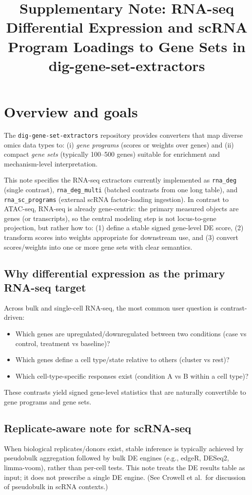\documentclass[11pt]{article}
\title{Supplementary Note: RNA-seq Differential Expression and scRNA Program Loadings to Gene Sets in dig-gene-set-extractors}
\author{}
\date{}
\begin{document}
\maketitle

\section*{Overview and goals}
The \texttt{dig-gene-set-extractors} repository provides converters that map diverse omics data types to:
(i) \emph{gene programs} (scores or weights over genes) and
(ii) compact \emph{gene sets} (typically 100--500 genes) suitable for enrichment and mechanism-level interpretation.

This note specifies the RNA-seq extractors currently implemented as \texttt{rna\_deg} (single contrast), \texttt{rna\_deg\_multi} (batched contrasts from one long table), and \texttt{rna\_sc\_programs} (external scRNA factor-loading ingestion). In contrast to ATAC-seq, RNA-seq is already gene-centric: the primary measured objects are genes (or transcripts), so the central modeling step is not locus-to-gene projection, but rather how to:
(1) define a stable signed gene-level DE score,
(2) transform scores into weights appropriate for downstream use, and
(3) convert scores/weights into one or more gene sets with clear semantics.

\subsection*{Why differential expression as the primary RNA-seq target}
Across bulk and single-cell RNA-seq, the most common user question is contrast-driven:
\begin{itemize}[leftmargin=2em]
\item Which genes are upregulated/downregulated between two conditions (case vs control, treatment vs baseline)?
\item Which genes define a cell type/state relative to others (cluster vs rest)?
\item Which cell-type-specific responses exist (condition A vs B within a cell type)?
\end{itemize}
These contrasts yield signed gene-level statistics that are naturally convertible to gene programs and gene sets.

\subsection*{Replicate-aware note for scRNA-seq}
When biological replicates/donors exist, stable inference is typically achieved by pseudobulk aggregation followed by bulk DE engines (e.g., edgeR, DESeq2, limma-voom), rather than per-cell tests. This note treats the DE results table as input; it does not prescribe a single DE engine. (See Crowell et al.\ for discussion of pseudobulk in scRNA contexts.) \cite{crowell2020muscat}
\end{document}
